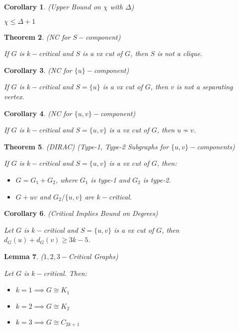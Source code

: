 \documentclass[12pt]{amsart}
\newtheorem{thm}{Theorem}
\newtheorem{lem}[thm]{Lemma}
\newtheorem{cor}[thm]{Corollary}
\theoremstyle{definition}
\begin{document}
\begin{cor} (Upper Bound on $\chi$ with $\Delta$)

$\chi \leq \Delta+1$
\end{cor}


\begin{thm} (NC for $S-$component)

If $G$ is $k-$critical and $S$ is a vx cut of $G$, then $S$ is not a clique.
\end{thm}


\begin{cor} (NC for $\{u\}-$component)

If $G$ is $k-$critical and $S=\{u\}$ is a vx cut of $G$, then $v$ is not a separating vertex.
\end{cor}


\begin{cor} (NC for $\{u,v\}-$component)

If $G$ is $k-$critical and $S=\{u,v\}$ is a vx cut of $G$, then $u\nsim v$.
\end{cor}


\begin{thm} (DIRAC) (Type-1, Type-2 Subgraphs for $\{u,v\}-$components)

If $G$ is $k-$critical and $S=\{u,v\}$ is a vx cut of $G$, then:
\begin{itemize}
  \item $G=G_1+G_2$, where $G_1$ is type-1 and $G_2$ is type-2.
  \item $G+uv$ and $G_2/\{u,v\}$ are $k-$critical.
\end{itemize}
\end{thm}


\begin{cor}(Critical Implies Bound on Degrees)

Let $G$ is $k-$critical and $S=\{u,v\}$ is a vx cut of $G$, then $d_G(u)+d_G(v)\geq 3k-5$.
\end{cor}


\begin{lem}($1,2,3-$Critical Graphs)

Let $G$ is $k-$critical. Then:
\begin{itemize}
  \item $k=1\implies G \cong K_1$
  \item $k=2\implies G \cong K_2$
  \item $k=3\implies G \cong C_{2k+1}$
\end{itemize}
\end{lem}
\end{document}
